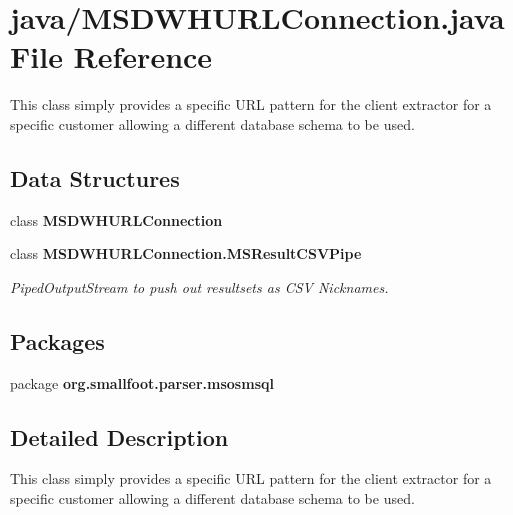 \section{java/\+M\+S\+D\+W\+H\+U\+R\+L\+Connection.java File Reference}
\label{MSDWHURLConnection_8java}


This class simply provides a specific U\+R\+L pattern for the client extractor for a specific customer allowing a different database schema to be used.  


\subsection*{Data Structures}
\begin{DoxyCompactItemize}
\item 
class {\bf M\+S\+D\+W\+H\+U\+R\+L\+Connection}
\item 
class {\bf M\+S\+D\+W\+H\+U\+R\+L\+Connection.\+M\+S\+Result\+C\+S\+V\+Pipe}
\begin{DoxyCompactList}\small\item\em Piped\+Output\+Stream to push out resultsets as C\+S\+V Nicknames. \end{DoxyCompactList}\end{DoxyCompactItemize}
\subsection*{Packages}
\begin{DoxyCompactItemize}
\item 
package {\bf org.\+smallfoot.\+parser.\+msosmsql}
\end{DoxyCompactItemize}


\subsection{Detailed Description}
This class simply provides a specific U\+R\+L pattern for the client extractor for a specific customer allowing a different database schema to be used. 

